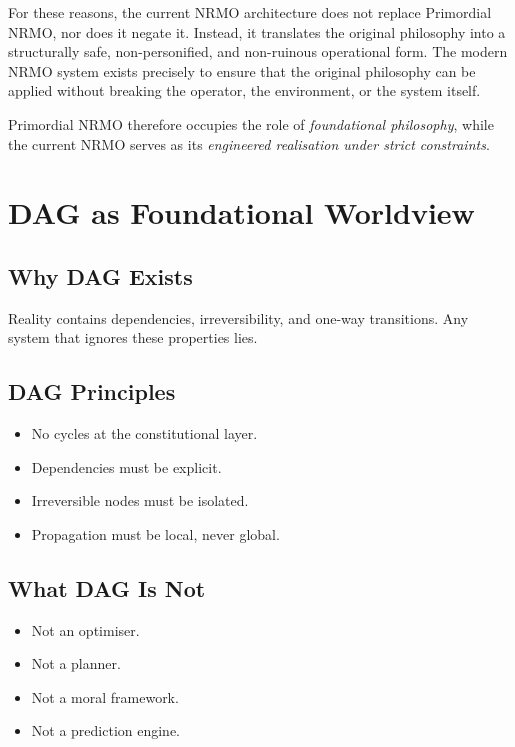 For these reasons, the current NRMO architecture does not replace
Primordial NRMO, nor does it negate it. Instead, it translates the
original philosophy into a structurally safe, non-personified, and
non-ruinous operational form. The modern NRMO system exists precisely
to ensure that the original philosophy can be applied without
breaking the operator, the environment, or the system itself.

Primordial NRMO therefore occupies the role of \emph{foundational
philosophy}, while the current NRMO serves as its \emph{engineered
realisation under strict constraints}.

\section{DAG as Foundational Worldview}
\label{sec:dag-worldview}

\subsection{Why DAG Exists}
\label{sec:dag-why}

Reality contains dependencies, irreversibility, and one-way
transitions. Any system that ignores these properties lies.


\subsection{DAG Principles}
\label{sec:dag-principles}

\begin{itemize}
\item No cycles at the constitutional layer.
\item Dependencies must be explicit.
\item Irreversible nodes must be isolated.
\item Propagation must be local, never global.
\end{itemize}

\subsection{What DAG Is Not}
\label{sec:dag-is-not}

\begin{itemize}
\item Not an optimiser.
\item Not a planner.
\item Not a moral framework.
\item Not a prediction engine.
\end{itemize}


